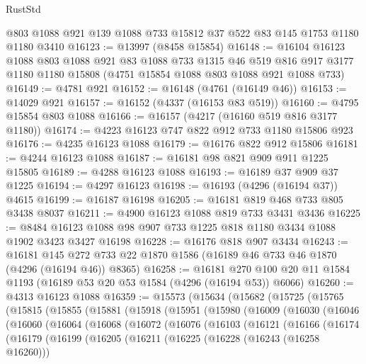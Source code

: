\begin{lexlean}{RustStd}
\begin{coremodule}
    @803
    @1088
    @921
    @139
    @1088
    @733
    @15812
    @37
    @522
    @83
    @145
    @1753
    @1180
    @1180
    @3410
@16123 := @13997 (@8458 @15854)
@16148 := @16104
    @16123
    @1088
    @803
    @1088
    @921
    @83
    @1088
    @733
    @1315
    @46
    @519
    @816
    @917
    @3177
    @1180
    @1180
    @15808
    (@4751 @15854 @1088 @803 @1088 @921 @1088 @733)
@16149 := @4781 @921
@16152 := @16148 (@4761 (@16149 @46))
@16153 := @14029 @921
@16157 := @16152 (@4337 (@16153 @83 @519))
@16160 := @4795 @15854 @803 @1088
@16166 := @16157 (@4217 (@16160 @519 @816 @3177 @1180))
@16174 := @4223 @16123 @747 @822 @912 @733 @1180 @15806 @923
@16176 := @4235 @16123 @1088
@16179 := @16176 @822 @912 @15806
@16181 := @4244 @16123 @1088
@16187 := @16181 @98 @821 @909 @911 @1225 @15805
@16189 := @4288 @16123 @1088
@16193 := @16189 @37 @909 @37 @1225
@16194 := @4297 @16123
@16198 := @16193 (@4296 (@16194 @37)) @4615
@16199 := @16187 @16198
@16205 := @16181 @819 @468 @733 @805 @3438 @8037
@16211 := @4900 @16123 @1088 @819 @733 @3431 @3436
@16225 := @8484 @16123 @1088 @98 @907 @733 @1225 @818 @1180 @3434 @1088 @1902 @3423 @3427 @16198
@16228 := @16176 @818 @907 @3434
@16243 := @16181
    @145
    @272
    @733
    @22
    @1870
    @1586
    (@16189 @46 @733 @46 @1870 (@4296 (@16194 @46)) @8365)
@16258 := @16181 @270 @100 @20 @11 @1584 @1193 (@16189 @53 @20 @53 @1584 (@4296 (@16194 @53)) @6066)
@16260 := @4313 @16123 @1088
@16359 := @15573
    (@15634
      (@15682
        (@15725
          (@15765
            (@15815
              (@15855
                (@15881
                  (@15918
                    (@15951
                      (@15980
                        (@16009
                          (@16030
                            (@16046
                              (@16060
                                (@16064
                                  (@16068
                                    (@16072
                                      (@16076
                                        (@16103
                                          (@16121
                                            (@16166
                                              (@16174
                                                (@16179
                                                  (@16199
                                                    (@16205
                                                      (@16211
                                                        (@16225
                                                          (@16228 (@16243 (@16258 @16260)))

\end{coremodule}
\end{lexlean}
